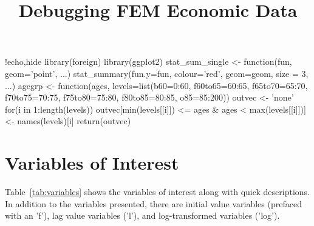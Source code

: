 \documentclass{article}
\title{Debugging FEM Economic Data}
\begin{document}
\begin{Rcode}{!echo,hide}
library(foreign)
library(ggplot2)
stat_sum_single <- function(fun, geom='point', ...) { 
  stat_summary(fun.y=fun, colour='red', geom=geom, size = 3, ...) 
} 
agegrp <- function(ages, levels=list(b60=0:60,
f60to65=60:65, f65to70=65:70, f70to75=70:75,
f75to80=75:80, f80to85=80:85, o85=85:200)) {
 outvec <- 'none'
 for(i in 1:length(levels)) {
    outvec[min(levels[[i]]) <= ages & ages < max(levels[[i]])] <- names(levels)[i]
  }
  return(outvec)
}
\end{Rcode}

\maketitle
\listoftables
\listoffigures

\section{Variables of Interest}
Table~\ref{tab:variables} shows the variables of interest along with quick descriptions. In addition to the variables presented, there are initial value variables (prefaced with an 'f'), lag value variables ('l'), and log-transformed variables ('log').
\end{document}
